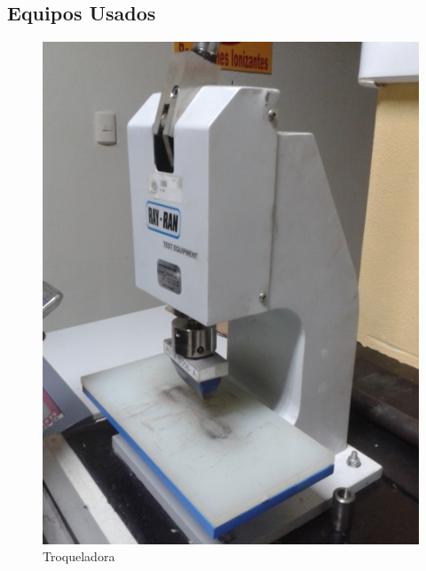 \documentclass[a4paper, 11pt]{article}
\begin{document}
\subsection{Equipos Usados}

\begin{figure}[h!] %

\hfill
\begin{minipage}[t]{.45\textwidth}
\begin{center}
\captionsetup{justification=centering}
\includegraphics[scale=0.2]{troqueladora.png}
\caption{Troqueladora}
\label{troqueladora}
\end{center}
\end{minipage}
\hfill
\begin{minipage}[t]{.45\textwidth}
\begin{center}
\captionsetup{justification=centering}

\end{center}
\end{minipage}
\end{figure}
\end{document}
